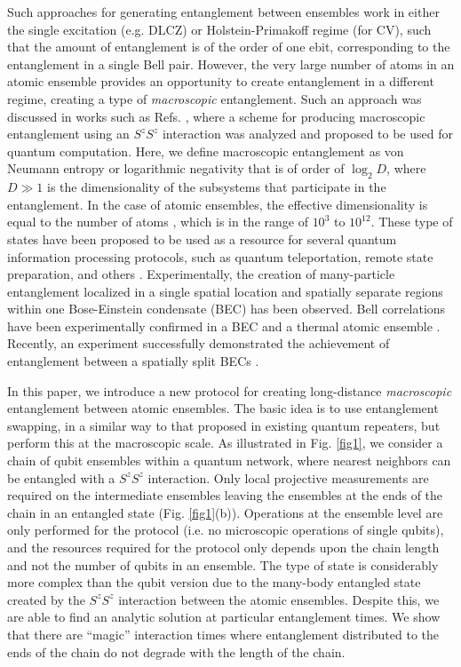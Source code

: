 \documentclass[%
  prx,%
  twocolumn,%
  preprintnumbers,%
  amsmath,%
  amssymb,%
  superscriptaddress%
]{revtex4}
\begin{document}
Such approaches for generating entanglement between ensembles work in either the single excitation  (e.g.  DLCZ) or Holstein-Primakoff regime (for CV), such that the amount of entanglement is of the order of one ebit, corresponding to the entanglement in a single Bell pair.  However, the very large number of atoms in an atomic ensemble provides an opportunity to create entanglement in a different regime, creating a type of {\it macroscopic} entanglement.  Such an approach was discussed in works such as Refs. \cite{byrnes2013fractality,pyrkov2013entanglement,rosseau2014,byrnes2012macroscopic,hussain2014geometric}, where a scheme for producing macroscopic entanglement using an $ S^z S^z$ interaction was analyzed and proposed to be used for quantum computation. Here, we define macroscopic entanglement as von Neumann entropy or logarithmic negativity that is of order of $ \log_2 D $, where $ D \gg 1  $ is the dimensionality of the subsystems that participate in the entanglement.  In the case of atomic ensembles, the effective dimensionality is equal to the number of atoms \cite{byrnes2020quantum}, which is in the range of $ 10^3 $ to $ 10^{12} $.   These type of states have been proposed to be used as a resource for several quantum information processing protocols, such as quantum teleportation, remote state preparation, and others \cite{pyrkov2014full,byrnes2015macroscopic,manish2021,byrnes2011accelerated}. Experimentally, 
the creation of many-particle entanglement localized in a single spatial location \cite{schmied2016bell} and spatially separate regions \cite{fadel2018spatial} within one Bose-Einstein condensate (BEC) has been observed. 
Bell correlations have been experimentally confirmed in a BEC \cite{schmied2016bell} and a thermal atomic ensemble \cite{engelsen2017}. Recently, an experiment successfully demonstrated the achievement of entanglement between a spatially split BECs \cite{Colciaghi2023}. 

In this paper, we introduce a new protocol for creating long-distance {\it macroscopic} entanglement between atomic ensembles. The basic idea is to use entanglement swapping, in a similar way to that proposed in existing quantum repeaters, but perform this at the macroscopic scale. As illustrated in Fig. \ref{fig1}, we consider a chain of qubit ensembles within a quantum network, where nearest neighbors can be entangled with a $S^z S^z$ interaction.  Only local projective measurements are required on the intermediate ensembles leaving the ensembles at the ends of the chain in an entangled state (Fig. \ref{fig1}(b)).  Operations at the ensemble level are only performed for the protocol (i.e. no microscopic operations of single qubits), and the resources required for the protocol only depends upon the chain length and not the number of qubits in an ensemble. 
The type of state is considerably more complex than the qubit version due to the many-body entangled state created by the $S^z S^z$ interaction between the atomic ensembles. Despite this, we are able to find an analytic solution at particular entanglement times.  We show that there are ``magic'' interaction times  where entanglement distributed to the ends of the chain do not degrade with the length of the chain. 
\end{document}

